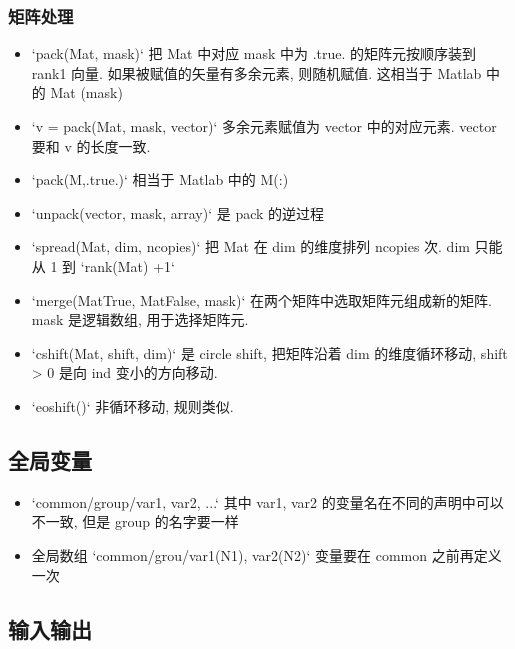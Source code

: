\subsubsection{矩阵处理}
\begin{itemize}
\item `pack(Mat, mask)` 把 Mat 中对应 mask 中为 .true. 的矩阵元按顺序装到 rank1 向量. 如果被赋值的矢量有多余元素, 则随机赋值. 这相当于 Matlab 中的 Mat (mask)
\item `v = pack(Mat, mask, vector)` 多余元素赋值为 vector 中的对应元素. vector 要和 v 的长度一致.
\item `pack(M,.true.)` 相当于 Matlab 中的 M(:)
\item `unpack(vector, mask, array)` 是 pack 的逆过程
\item `spread(Mat, dim, ncopies)` 把 Mat 在 dim 的维度排列 ncopies 次. dim 只能从 1 到 `rank(Mat) +1`
\item `merge(MatTrue, MatFalse, mask)` 在两个矩阵中选取矩阵元组成新的矩阵. mask 是逻辑数组, 用于选择矩阵元.
\item `cshift(Mat, shift, dim)` 是 circle shift, 把矩阵沿着 dim 的维度循环移动, shift > 0 是向 ind 变小的方向移动.
\item `eoshift()` 非循环移动, 规则类似.
\end{itemize}

\subsection{全局变量}
\begin{itemize}
\item `common/group/var1, var2, ...` 其中 var1, var2 的变量名在不同的声明中可以不一致, 但是 group 的名字要一样
\item 全局数组 `common/grou/var1(N1), var2(N2)` 变量要在 common 之前再定义一次
\end{itemize}

\subsection{输入输出}

